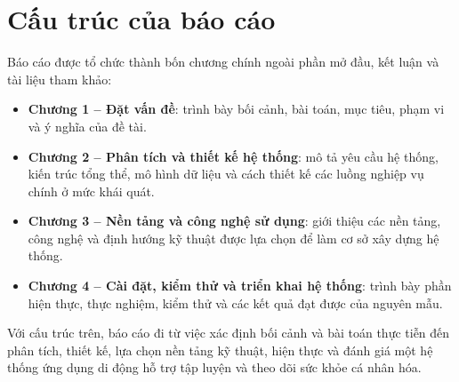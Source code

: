 \section{Cấu trúc của báo cáo}

Báo cáo được tổ chức thành bốn chương chính ngoài phần mở đầu, kết luận và tài liệu tham khảo:

\begin{itemize}
    \item \textbf{Chương 1 -- Đặt vấn đề}: trình bày bối cảnh, bài toán, mục tiêu, phạm vi và ý nghĩa của đề tài.
    \item \textbf{Chương 2 -- Phân tích và thiết kế hệ thống}: mô tả yêu cầu hệ thống, kiến trúc tổng thể, mô hình dữ liệu và cách thiết kế các luồng nghiệp vụ chính ở mức khái quát.
    \item \textbf{Chương 3 -- Nền tảng và công nghệ sử dụng}: giới thiệu các nền tảng, công nghệ và định hướng kỹ thuật được lựa chọn để làm cơ sở xây dựng hệ thống.
    \item \textbf{Chương 4 -- Cài đặt, kiểm thử và triển khai hệ thống}: trình bày phần hiện thực, thực nghiệm, kiểm thử và các kết quả đạt được của nguyên mẫu.
\end{itemize}

Với cấu trúc trên, báo cáo đi từ việc xác định bối cảnh và bài toán thực tiễn đến phân tích, thiết kế, lựa chọn nền tảng kỹ thuật, hiện thực và đánh giá một hệ thống ứng dụng di động hỗ trợ tập luyện và theo dõi sức khỏe cá nhân hóa.

